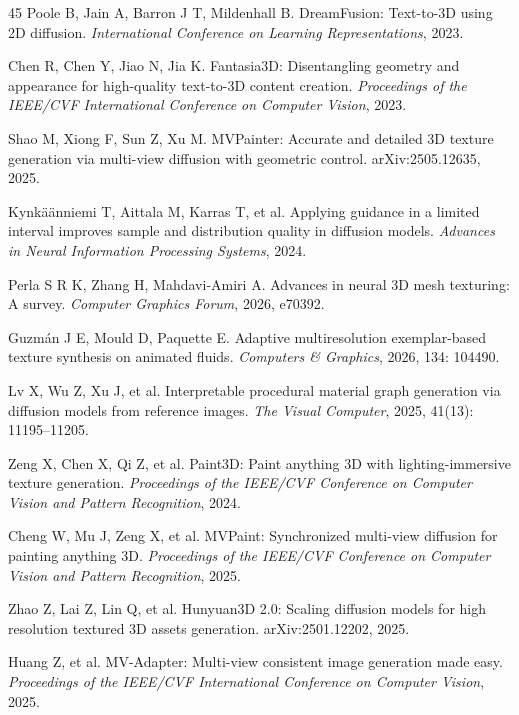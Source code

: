 \documentclass[times,twocolumn,final]{elsarticle}
\providecommand{\DIFadd}[1]{{\protect\color{blue} \sf #1}} %
\providecommand{\DIFaddbegin}{} %
\newcommand{\DIFaddincludegraphics}[2][]{{\color{blue}\fbox{\DIFOincludegraphics[#1]{#2}}}} %
\DeclareRobustCommand{\DIFaddbegin}{\DIFOaddbegin \let\includegraphics\DIFaddincludegraphics} %
\begin{document}
\begin{thebibliography}{45}
Poole B, Jain A, Barron J T, Mildenhall B. DreamFusion: Text-to-3D using 2D diffusion. \textit{International Conference on Learning Representations}, 2023.

Chen R, Chen Y, Jiao N, Jia K. Fantasia3D: Disentangling geometry and appearance for high-quality text-to-3D content creation. \textit{Proceedings of the IEEE/CVF International Conference on Computer Vision}, 2023.

\DIFaddbegin {}
\DIFadd{Shao M, Xiong F, Sun Z, Xu M. MVPainter: Accurate and detailed 3D texture generation via multi-view diffusion with geometric control. arXiv:2505.12635, 2025.
}

\DIFadd{Kynk\"a\"anniemi T, Aittala M, Karras T, et al. Applying guidance in a limited interval improves sample and distribution quality in diffusion models. \textit{Advances in Neural Information Processing Systems}, 2024.
}

\DIFadd{Perla S R K, Zhang H, Mahdavi-Amiri A. Advances in neural 3D mesh texturing: A survey. \textit{Computer Graphics Forum}, 2026, e70392.
}

\DIFadd{Guzm\'an J E, Mould D, Paquette E. Adaptive multiresolution exemplar-based texture synthesis on animated fluids. \textit{Computers \& Graphics}, 2026, 134: 104490.
}

\DIFadd{Lv X, Wu Z, Xu J, et al. Interpretable procedural material graph generation via diffusion models from reference images. \textit{The Visual Computer}, 2025, 41(13): 11195--11205.
}

\DIFadd{Zeng X, Chen X, Qi Z, et al. Paint3D: Paint anything 3D with lighting-immersive texture generation. \textit{Proceedings of the IEEE/CVF Conference on Computer Vision and Pattern Recognition}, 2024.
}

\DIFadd{Cheng W, Mu J, Zeng X, et al. MVPaint: Synchronized multi-view diffusion for painting anything 3D. \textit{Proceedings of the IEEE/CVF Conference on Computer Vision and Pattern Recognition}, 2025.
}

\DIFadd{Zhao Z, Lai Z, Lin Q, et al. Hunyuan3D 2.0: Scaling diffusion models for high resolution textured 3D assets generation. arXiv:2501.12202, 2025.
}

\DIFadd{Huang Z, et al. MV-Adapter: Multi-view consistent image generation made easy. \textit{Proceedings of the IEEE/CVF International Conference on Computer Vision}, 2025.
}


\end{thebibliography}
\end{document}
